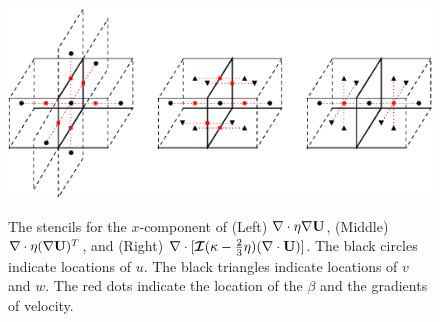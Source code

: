 \documentclass[final]{siamltex}
\def\Ub {{\bf U}}
\def\bI {\bm{\mathcal{I}}}
\begin{document}
\begin{figure}[tb]
\centering
\includegraphics[width=5.25in]{viscOp_3d}
\label{fig:viscOp_3d}
\caption{The stencils for the $x$-component of (Left) $\nabla\cdot\eta\nabla\Ub$, (Middle) 
$\nabla\cdot\eta(\nabla\Ub)^T$, and (Right) $\nabla\cdot[\bI(\kappa-\frac{2}{3}\eta)(\nabla\cdot\Ub)]$.  
The black circles indicate locations of $u$.
The black triangles indicate locations of $v$ and $w$.
The red dots indicate the location of the $\beta$ and the gradients of velocity.}
\end{figure}
\end{document}
